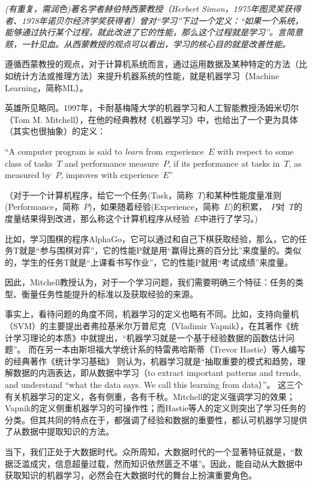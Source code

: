 {\em (有重复，需润色)著名学者赫伯特\textperiodcentered 西蒙教授（Herbert Simon，1975年图灵奖获得者、1978年诺贝尔经济学奖获得者）曾对“学习”下过一个定义：“如果一个系统，能够通过执行某个过程，就此改进了它的性能，那么这个过程就是学习”。言简意赅，一针见血。从西蒙教授的观点可以看出，学习的核心目的就是改善性能。

遵循西蒙教授的观点，对于计算机系统而言，通过运用数据及某种特定的方法（比如统计方法或推理方法）来提升机器系统的性能，就是机器学习（Machine Learning，简称ML）。

英雄所见略同。1997年，卡耐基梅隆大学的机器学习和人工智能教授汤姆\textperiodcentered 米切尔（Tom M. Mitchell），在他的经典教材《机器学习》\cite{mitchell1997}中，也给出了一个更为具体（其实也很抽象）的定义：

“A computer program is said to {\em learn} from experience~$ E$ with respect to some class of tasks~$T$ and performance measure~$P$, if its performance at tasks in~$T$, as measured by~$P$, improves with experience~$E$”

（对于一个计算机程序，给它一个任务(Task，简称~$T$)和某种性能度量准则(Performance，简称~$P$)，如果随着经验(Experience，简称~$E$)的积累，~$P$对~$T$的度量结果得到改进，那么称这个计算机程序从经验~$E$中进行了学习。)

比如，学习围棋的程序AlphaGo，它可以通过和自己下棋获取经验，那么，它的任务T就是“参与围棋对弈”，它的性能P就是用“赢得比赛的百分比”来度量的。类似的，学生的任务T就是“上课看书写作业”，它的性能P就用“考试成绩”来度量。

因此，Mitchell教授认为，对于一个学习问题，我们需要明确三个特征：任务的类型、衡量任务性能提升的标准以及获取经验的来源。

事实上，看待问题的角度不同，机器学习的定义也略有不同。比如，支持向量机（SVM）的主要提出者弗拉基米尔\textperiodcentered 万普尼克（Vladimir Vapnik），在其著作《统计学习理论的本质》\cite{vapnik2000统计学习理论的本质}中就提出，“机器学习就是一个基于经验数据的函数估计问题”。
而在另一本由斯坦福大学统计系的特雷弗\textperiodcentered 哈斯蒂（Trevor Hastie）等人编写的经典著作《统计学习基础》\cite{hastie2015} 则认为，机器学习就是“抽取重要的模式和趋势，理解数据的内涵表达，即从数据中学习（to extract important patterns and trends, and understand “what the data says. We call this learning from data）”。
这三个有关机器学习的定义，各有侧重，各有千秋。Mitchell的定义强调学习的效果；Vapnik的定义侧重机器学习的可操作性；而Hastie等人的定义则突出了学习任务的分类。但其共同的特点在于，都强调了经验和数据的重要性，都认可机器学习提供了从数据中提取知识的方法。

当下，我们正处于大数据时代。众所周知，大数据时代的一个显著特征就是，“数据泛滥成灾，信息超量过载，然而知识依然匮乏不堪”。因此，能自动从大数据中获取知识的机器学习，必然会在大数据时代的舞台上扮演重要角色。}

